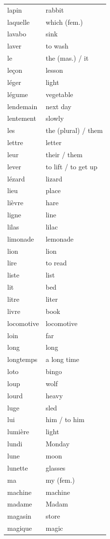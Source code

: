 \documentclass[12pt,a4paper]{article}
\begin{document}
\begin{longtable}{p{4cm} p{6cm}}
lapin & rabbit \\
laquelle & which (fem.) \\
lavabo & sink \\
laver & to wash \\
le & the (mas.) / it \\
leçon & lesson \\
léger & light \\
légume & vegetable \\
lendemain & next day \\
lentement & slowly \\
les & the (plural) / them \\
lettre & letter \\
leur & their / them \\
lever & to lift / to get up \\
lézard & lizard \\
lieu & place \\
lièvre & hare \\
ligne & line \\
lilas & lilac \\
limonade & lemonade \\
lion & lion \\
lire & to read \\
liste & list \\
lit & bed \\
litre & liter \\
livre & book \\
locomotive & locomotive \\
loin & far \\
long & long \\
longtemps & a long time \\
loto & bingo \\
loup & wolf \\
lourd & heavy \\
luge & sled \\
lui & him / to him \\
lumière & light \\
lundi & Monday \\
lune & moon \\
lunette & glasses \\
ma & my (fem.) \\
machine & machine \\
madame & Madam \\
magasin & store \\
magique & magic \\

\end{longtable}
\end{document}
